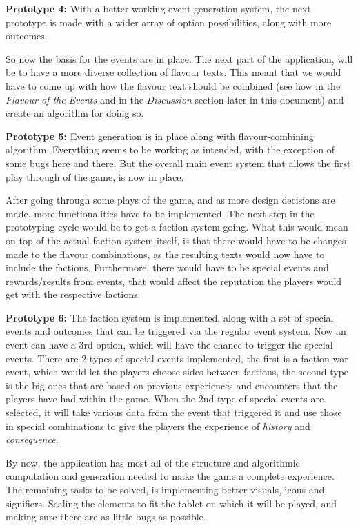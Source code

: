 \begin{center}
\textbf{Prototype 4:}
With a better working event generation system, the next prototype is made with a wider array of option possibilities, along with more outcomes.
\end{center}
So now the basis for the events are in place. The next part of the application, will be to have a more diverse collection of flavour texts.
This meant that we would have to come up with how the flavour text should be combined (see how in the \textit{Flavour of the Events} and in the \textit{Discussion} section later in this document) and create an algorithm for doing so. 

\begin{center}
\textbf{Prototype 5:}
Event generation is in place along with flavour-combining algorithm.
Everything seems to be working as intended, with the exception of some bugs here and there. But the overall main event system that allows the first play through of the game, is now in place.
\end{center}
After going through some plays of the game, and as more design decisions are made, more functionalities have to be implemented. The next step in the prototyping cycle would be to get a faction system going. What this would mean on top of the actual faction system itself, is that there would have to be changes made to the flavour combinations, as the resulting texts would now have to include the factions. Furthermore, there would have to be special events and rewards/results from events, that would affect the reputation the players would get with the respective factions.

\begin{center}
\textbf{Prototype 6:}
The faction system is implemented, along with a set of special events and outcomes that can be triggered via the regular event system. Now an event can have a 3rd option, which will have the chance to trigger the special events. There are 2 types of special events implemented, the first is a faction-war event, which would let the players choose sides between factions, the second type is the big ones that are based on previous experiences and encounters that the players have had within the game. When the 2nd type of special events are selected, it will take various data from the event that triggered it and use those in special combinations to give the players the experience of \textit{history} and \textit{consequence}.
\end{center}
By now, the application has most all of the structure and algorithmic computation and generation needed to make the game a complete experience.
The remaining tasks to be solved, is implementing better visuals, icons and signifiers. Scaling the elements to fit the tablet on which it will be played, and making sure there are as little bugs as possible.

